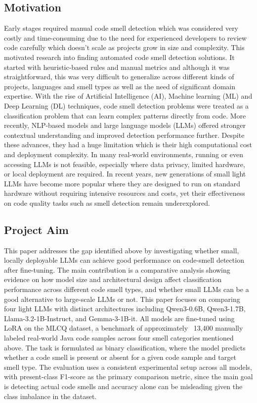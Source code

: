 \subsection{Motivation}
\label{subsec:motivation}
Early stages required manual code smell detection which was considered very costly and time-consuming due to the need for experienced developers to review code carefully which doesn’t scale as projects grow in size and complexity. This motivated research into finding automated code smell detection solutions. It started with heuristic-based rules and manual metrics and although it was straightforward, this was very difficult to generalize across different kinds of projects, languages and smell types as well as the need of significant domain expertise.
With the rise of Artificial Intelligence (AI), Machine learning (ML) and Deep Learning (DL) techniques, code smell detection problems were treated as a classification problem that can learn complex patterns directly from code. More recently, NLP-based models and large language models (LLMs) offered stronger contextual understanding and improved detection performance further.
Despite these advances, they had a huge limitation which is their high computational cost and deployment complexity. In many real-world environments, running or even accessing LLMs is not feasible, especially where data privacy, limited hardware, or local deployment are required. In recent years, new generations of small light LLMs have become more popular where they are designed to run on standard hardware without requiring intensive resources and costs, yet their effectiveness on code quality tasks such as smell detection remain underexplored.

\subsection{Project Aim}
\label{subsec:project-aim}
This paper addresses the gap identified above by investigating whether small, locally deployable LLMs can achieve good performance on code-smell detection after fine-tuning. The main contribution is a comparative analysis showing evidence on how model size and architectural design affect classification performance across different code smell types, and whether small LLMs can be a good alternative to large-scale LLMs or not. This paper focuses on comparing four light LLMs with distinct architectures including Qwen3-0.6B, Qwen3-1.7B, Llama-3.2-1B-Instruct, and Gemma-3-1B-it.
All models are fine-tuned using LoRA on the MLCQ dataset, a benchmark of approximately ~13,400 manually labeled real-world Java code samples across four smell categories mentioned above. The task is formulated as binary classification, where the model predicts whether a code smell is present or absent for a given code sample and target smell type. The evaluation uses a consistent experimental setup across all models, with present-class F1-score as the primary comparison metric, since the main goal is detecting actual code smells and accuracy alone can be misleading given the class imbalance in the dataset.